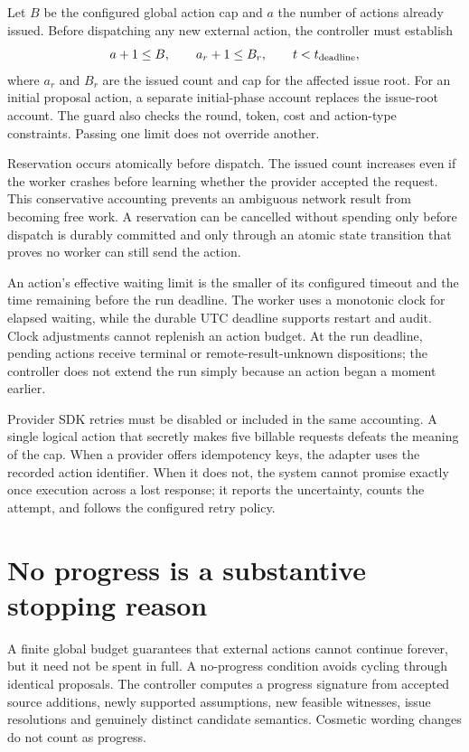 \documentclass[12pt,a4paper,oneside,openany]{book}
\begin{document}
Let $B$ be the configured global action cap and $a$ the number of actions already
issued. Before dispatching any new external action, the controller must establish
\begin{equation}
 a+1\leq B,\qquad a_r+1\leq B_r,\qquad t<t_{\rm deadline},
 \label{eq:budget-guard}
\end{equation}
where $a_r$ and $B_r$ are the issued count and cap for the affected issue root.
For an initial proposal action, a separate initial-phase account replaces the
issue-root account. The guard also checks the round, token, cost and action-type
constraints. Passing one limit does not override another.

Reservation occurs atomically before dispatch. The issued count increases even if
the worker crashes before learning whether the provider accepted the request.
This conservative accounting prevents an ambiguous network result from becoming
free work. A reservation can be cancelled without spending only before dispatch
is durably committed and only through an atomic state transition that proves no
worker can still send the action.

An action's effective waiting limit is the smaller of its configured timeout
and the time remaining before the run deadline. The worker uses a monotonic clock
for elapsed waiting, while the durable UTC deadline supports restart and audit.
Clock adjustments cannot replenish an action budget. At the run deadline, pending
actions receive terminal or remote-result-unknown dispositions; the controller
does not extend the run simply because an action began a moment earlier.

Provider SDK retries must be disabled or included in the same accounting. A
single logical action that secretly makes five billable requests defeats the
meaning of the cap. When a provider offers idempotency keys, the adapter uses the
recorded action identifier. When it does not, the system cannot promise exactly
once execution across a lost response; it reports the uncertainty, counts the
attempt, and follows the configured retry policy.

\section{No progress is a substantive stopping reason}
\label{merge:M06:13}


A finite global budget guarantees that external actions cannot continue forever,
but it need not be spent in full. A no-progress condition avoids cycling through
identical proposals. The controller computes a progress signature from accepted
source additions, newly supported assumptions, new feasible witnesses, issue
resolutions and genuinely distinct candidate semantics. Cosmetic wording changes
do not count as progress.
\end{document}
